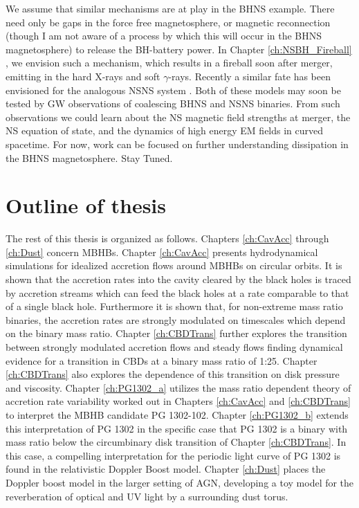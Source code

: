 We assume that similar mechanisms are at play in the BHNS example. There need
only be gaps in the force free magnetosphere, or magnetic reconnection (though
I am not aware of a process by which this will occur in the BHNS magnetosphere) to
release the BH-battery power. In Chapter \ref{ch:NSBH_Fireball}
\citep{DL:2016}, we envision such a mechanism, which results in a fireball
soon after merger, emitting in the hard X-rays and soft $\gamma$-rays. Recently
a similar fate has been envisioned for the analogous NSNS system
\citep{MetzgerNSNS:2016}. Both of these models may soon be
tested by GW observations of coalescing BHNS and NSNS binaries. From such
observations we could learn about the NS magnetic field strengths at merger,
the NS equation of state, and the dynamics of high energy EM fields in curved
spacetime. For now, work can be focused on further understanding dissipation
in the BHNS magnetosphere. Stay Tuned.











\section{Outline of thesis}   

The rest of this thesis is organized as follows. Chapters \ref{ch:CavAcc}
through \ref{ch:Dust} concern MBHBs. Chapter \ref{ch:CavAcc} presents
hydrodynamical simulations for idealized accretion flows around MBHBs on
circular orbits. It is shown that the accretion rates into the cavity cleared
by the black holes is traced by accretion streams which can feed the black
holes at a rate comparable to that of a single black hole. Furthermore it is
shown that, for non-extreme mass ratio binaries, the accretion rates are
strongly modulated on timescales which depend on the binary mass ratio.
Chapter \ref{ch:CBDTrans} further explores the transition between strongly
modulated accretion flows and steady flows finding dynamical evidence for a
transition in CBDs at a binary mass ratio of 1:25. Chapter \ref{ch:CBDTrans}
also explores the dependence of this transition on disk pressure and
viscosity. Chapter \ref{ch:PG1302_a} utilizes the mass ratio dependent theory
of accretion rate variability worked out in Chapters \ref{ch:CavAcc} and
\ref{ch:CBDTrans} to interpret the MBHB candidate PG 1302-102. Chapter
\ref{ch:PG1302_b} extends this interpretation of PG 1302 in the specific case
that PG 1302 is a binary with mass ratio below the circumbinary disk transition of Chapter
\ref{ch:CBDTrans}. In this case, a compelling interpretation for the periodic
light curve of PG 1302 is found in the relativistic Doppler Boost model.
Chapter \ref{ch:Dust} places the Doppler boost model in the larger setting of
AGN, developing a toy model for the reverberation of optical and UV light by a
surrounding dust torus. 

